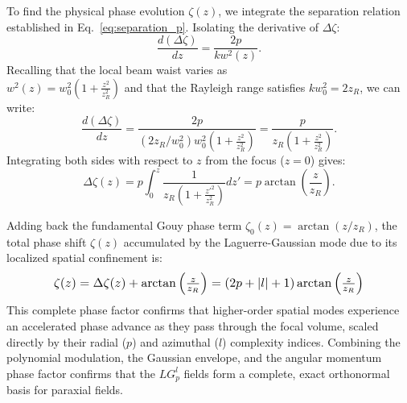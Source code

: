 \begin{resolucao}[Solution]
        To find the physical phase evolution $\zeta(z)$, we integrate the separation relation established in Eq.~\eqref{eq:separation_p}. Isolating the derivative of $\Delta\zeta$:
        \[
        \frac{d(\Delta\zeta)}{dz} = \frac{2p}{k w^2(z)}.
        \]
        Recalling that the local beam waist varies as\\$w^2(z) = w_0^2 \left(1 + \frac{z^2}{z_R^2}\right)$ and that the Rayleigh range satisfies $k w_0^2 = 2 z_R$, we can write:
        \[
        \frac{d(\Delta\zeta)}{dz} = \frac{2p}{\left(2 z_R / w_0^2\right) w_0^2 \left(1 + \frac{z^2}{z_R^2}\right)} = \frac{p}{z_R \left(1 + \frac{z^2}{z_R^2}\right)}.
        \]
        Integrating both sides with respect to $z$ from the focus ($z=0$) gives:
        \begin{equation}
            \Delta\zeta(z) = p \int_{0}^{z} \frac{1}{z_R \left(1 + \frac{z'^2}{z_R^2}\right)} dz' = p \arctan\left(\frac{z}{z_R}\right).
        \end{equation}
        
        Adding back the fundamental Gouy phase term $\zeta_0(z) = \arctan(z/z_R)$, the total phase shift $\zeta(z)$ accumulated by the Laguerre-Gaussian mode due to its localized spatial confinement is:
        \begin{equation}
            \resizebox{0.8\columnwidth}{!}{$
                \zeta(z) = \Delta\zeta(z) + \arctan\left(\frac{z}{z_R}\right)
                = (2p + |l| + 1)\arctan\left(\frac{z}{z_R}\right)
            $}
        \end{equation}
        This complete phase factor confirms that higher-order spatial modes experience an accelerated phase advance as they pass through the focal volume, scaled directly by their radial ($p$) and azimuthal ($l$) complexity indices. Combining the polynomial modulation, the Gaussian envelope, and the angular momentum phase factor confirms that the $LG_p^l$ fields form a complete, exact orthonormal basis for paraxial fields.

\end{resolucao}